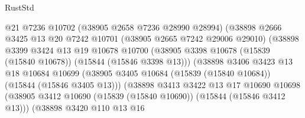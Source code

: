 \begin{lexlean}{RustStd}
\begin{coremodule}
                                  @21
                                  @7236
                                  @10702
                                  (@38905 @2658 @7236 @28990 @28994)
                                  (@38898
                                    @2666
                                    @3425
                                    @13
                                    @20
                                    @7242
                                    @10701
                                    (@38905 @2665 @7242 @29006 @29010)
                                    (@38898
                                      @3399
                                      @3424
                                      @13
                                      @19
                                      @10678
                                      @10700
                                      (@38905
                                        @3398
                                        @10678
                                        (@15839 (@15840 @10678))
                                        (@15844 (@15846 @3398 @13)))
                                      (@38898
                                        @3406
                                        @3423
                                        @13
                                        @18
                                        @10684
                                        @10699
                                        (@38905
                                          @3405
                                          @10684
                                          (@15839 (@15840 @10684))
                                          (@15844 (@15846 @3405 @13)))
                                        (@38898
                                          @3413
                                          @3422
                                          @13
                                          @17
                                          @10690
                                          @10698
                                          (@38905
                                            @3412
                                            @10690
                                            (@15839 (@15840 @10690))
                                            (@15844 (@15846 @3412 @13)))
                                          (@38898
                                            @3420
                                            @110
                                            @13
                                            @16

\end{coremodule}
\end{lexlean}
